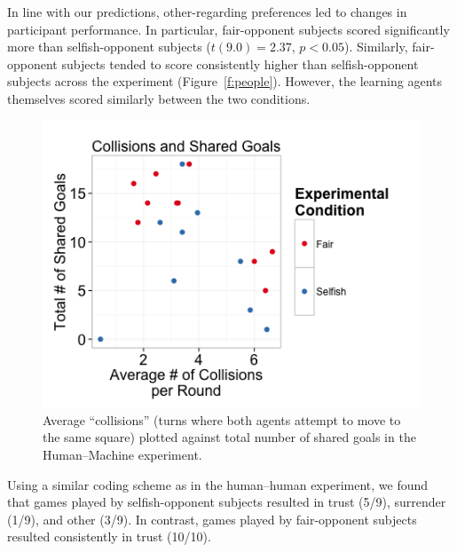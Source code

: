 \documentclass[letterpaper]{article}
\begin{document}
In line with our predictions, other-regarding preferences led to
changes in participant performance. In particular, fair-opponent
subjects scored significantly more than selfish-opponent subjects
($t(9.0) = 2.37$, $p < 0.05$). Similarly, fair-opponent subjects
tended to score consistently higher than selfish-opponent subjects
across the experiment (Figure~\ref{f:people}). However, the learning
agents themselves scored similarly between the two conditions. 


\begin{figure}
\centering
\includegraphics[width=0.8\columnwidth]{figures/human_v_agent_collisions_goals.png}
\caption{Average ``collisions'' (turns where both agents attempt to move to the same square) plotted against total number of shared
goals in the Human--Machine experiment.}
\label{f:collide}
\end{figure}

Using a similar coding scheme as in the human--human experiment, we
found that games played by selfish-opponent subjects resulted in trust
(5/9), surrender (1/9), and other (3/9). In contrast, games played by
fair-opponent subjects resulted consistently in trust (10/10).
\end{document}
